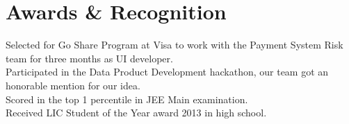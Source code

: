 \documentclass[letterpaper,11pt]{article}
\begin{document}
\section{Awards \& Recognition}
\begin{itemize}[leftmargin=0.15in, label={}]
	\small{\item{
		{Selected for Go Share Program at Visa to work with the Payment System Risk team for three months as UI developer.} \\
		{Participated in the Data Product Development hackathon, our team got an honorable mention for our idea.} \\
		{Scored in the top 1 percentile in JEE Main examination.} \\
		{Received LIC Student of the Year award 2013 in high school.} \\
	}}
\end{itemize}
\end{document}
